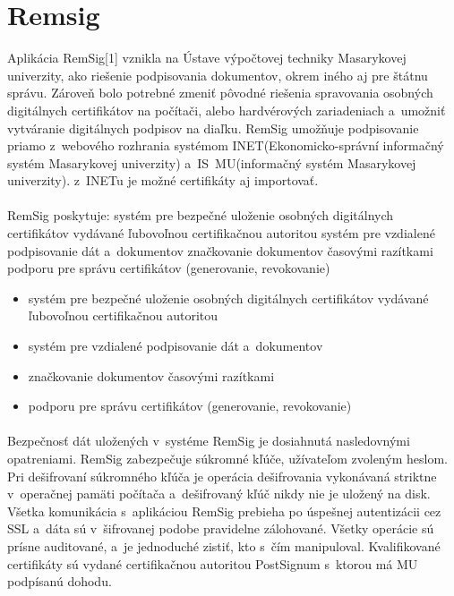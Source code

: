 \documentclass[
  printed, %
  notable,   %
  nolof,     %
    oneside,       %
  nolot,     %
]{fithesis3}
\begin{document}
\section{Remsig}
Aplikácia RemSig[1] vznikla na Ústave výpočtovej techniky Masarykovej univerzity, ako riešenie podpisovania dokumentov, okrem iného aj pre štátnu správu. Zároveň bolo potrebné zmeniť pôvodné riešenia spravovania osobných digitálnych certifikátov na počítači, alebo hardvérových zariadeniach a~umožniť vytváranie digitálnych podpisov na diaľku. RemSig umožňuje podpisovanie priamo z~webového rozhrania systémom INET(Ekonomicko-správní informačný systém Masarykovej univerzity) a~IS~MU(informačný systém Masarykovej univerzity). z~INETu je možné certifikáty aj importovať.\paragraph{}
RemSig poskytuje:
systém pre bezpečné uloženie osobných digitálnych certifikátov vydávané ľubovoľnou certifikačnou autoritou
systém pre vzdialené podpisovanie dát a~dokumentov 
značkovanie dokumentov časovými razítkami 
podporu pre správu certifikátov (generovanie, revokovanie)
\begin{itemize}

\item systém pre bezpečné uloženie osobných digitálnych certifikátov vydávané ľubovoľnou certifikačnou autoritou
\item systém pre vzdialené podpisovanie dát a~dokumentov
\item značkovanie dokumentov časovými razítkami 
\item podporu pre správu certifikátov (generovanie, revokovanie)

 \end{itemize}

\paragraph{}
Bezpečnosť dát uložených v~systéme RemSig je dosiahnutá nasledovnými opatreniami. RemSig zabezpečuje súkromné kľúče, užívateľom zvoleným heslom. Pri dešifrovaní súkromného kľúča je operácia dešifrovania vykonávaná striktne v~operačnej pamäti počítača a~dešifrovaný kľúč nikdy nie je uložený na disk. Všetka komunikácia s~aplikáciou RemSig prebieha po úspešnej autentizácii cez SSL a~dáta sú v~šifrovanej podobe pravidelne zálohované. Všetky operácie sú prísne auditované, a~je jednoduché zistiť, kto s~čím manipuloval. Kvalifikované certifikáty sú vydané certifikačnou autoritou PostSignum s~ktorou má MU podpísanú dohodu.
\end{document}
